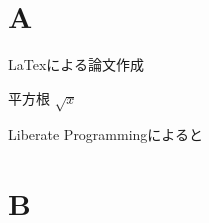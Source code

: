 \documentclass{jarticle}
\begin{document}
\tableofcontents

\section{A}
LaTexによる論文作成

平方根 $\sqrt{x}$

Liberate Programming\cite{Knuth84literateprogramming}によると

\section{B}



\end{document}
